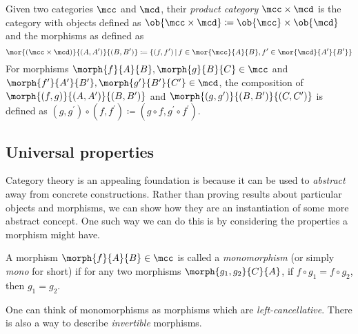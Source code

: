 \begin{example}
    Given two categories \(\mcc\) and \(\mcd\), their \emph{product category}
    \(\mcc \times \mcd\) is the category with objects defined as \(
    \ob{\mcc \times \mcd} \coloneqq \ob{\mcc} \times \ob{\mcd}
    \) and the morphisms as defined as \[
        \mor{(\mcc \times \mcd)}{(A, A^\prime)}{(B, B^\prime)}
        \coloneqq
        \{
        (f, f^\prime)
        \,|\,
        f \in \mor{\mcc}{A}{B},
        f^\prime \in \mor{\mcd}{A^\prime}{B^\prime}
        \}
    \]
    For morphisms \(\morph{f}{A}{B}, \morph{g}{B}{C} \in \mcc\) and \(
    \morph{f^\prime}{A^\prime}{B^\prime}, \morph{g^\prime}{B^\prime}{C^\prime}
    \in \mcd\), the composition of \(\morph{(f,g)}{(A,A^\prime)}{(B,B^\prime)}\)
    and \(\morph{(g,g^\prime)}{(B,B^\prime)}{(C,C^\prime)}\) is defined as \(
    (g, g^\prime) \circ (f, f^\prime)
    \coloneqq
    (g \circ f, g^\prime \circ f^\prime)\).
\end{example}

\subsection{Universal properties}

Category theory is an appealing foundation is because it can be used to
\emph{abstract} away from concrete constructions.
Rather than proving results about particular objects and morphisms, we can
show how they are an instantiation of some more abstract concept.
One such way we can do this is by considering the properties a morphism might
have.

\begin{definition}[Monomorphism]
    A morphism \(\morph{f}{A}{B} \in \mcc\) is called a \emph{monomorphism} (or
    simply \emph{mono} for short) if for any two morphisms
    \(\morph{g_1,g_2}{C}{A}\), if \(f \circ g_1 = f \circ g_2\), then
    \(g_1 = g_2\).
    \begin{center}
    \end{center}
\end{definition}

One can think of monomorphisms as morphisms which are \emph{left-cancellative}.
There is also a way to describe \emph{invertible} morphisms.

